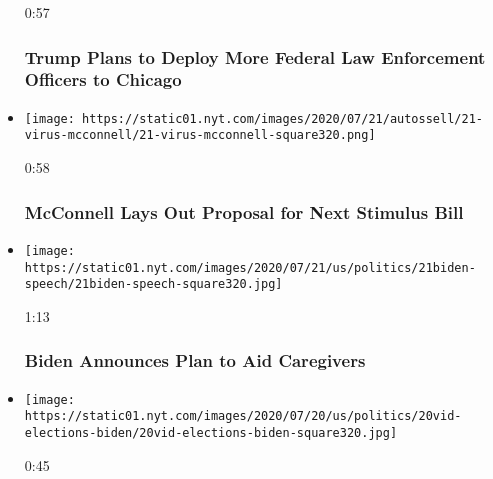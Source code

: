 \begin{itemize}
  0:57

  \hypertarget{trump-plans-to-deploy-more-federal-law-enforcement-officers-to-chicago}{%
  \subsubsection{Trump Plans to Deploy More Federal Law Enforcement
  Officers to
  Chicago}\label{trump-plans-to-deploy-more-federal-law-enforcement-officers-to-chicago}}
\item
  \href{https://www.nytimes.com/video/us/100000007250230/mcconnell-proposal-relief-package.html?action=click\&module=video-series-bar\&region=header\&pgtype=Article\&playlistId=video/us-politics}{}

  \texttt{[image: https://static01.nyt.com/images/2020/07/21/autossell/21-virus-mcconnell/21-virus-mcconnell-square320.png]}

  0:58

  \hypertarget{mcconnell-lays-out-proposal-for-next-stimulus-bill}{%
  \subsubsection{McConnell Lays Out Proposal for Next Stimulus
  Bill}\label{mcconnell-lays-out-proposal-for-next-stimulus-bill}}
\item
  \href{https://www.nytimes.com/video/us/100000007249436/biden-announces-plan-to-aid-caregivers.html?action=click\&module=video-series-bar\&region=header\&pgtype=Article\&playlistId=video/us-politics}{}

  \texttt{[image: https://static01.nyt.com/images/2020/07/21/us/politics/21biden-speech/21biden-speech-square320.jpg]}

  1:13

  \hypertarget{biden-announces-plan-to-aid-caregivers}{%
  \subsubsection{Biden Announces Plan to Aid
  Caregivers}\label{biden-announces-plan-to-aid-caregivers}}
\item
  \href{https://www.nytimes.com/video/us/100000007248132/biden-muslim-voters.html?action=click\&module=video-series-bar\&region=header\&pgtype=Article\&playlistId=video/us-politics}{}

  \texttt{[image: https://static01.nyt.com/images/2020/07/20/us/politics/20vid-elections-biden/20vid-elections-biden-square320.jpg]}

  0:45


\end{itemize}
